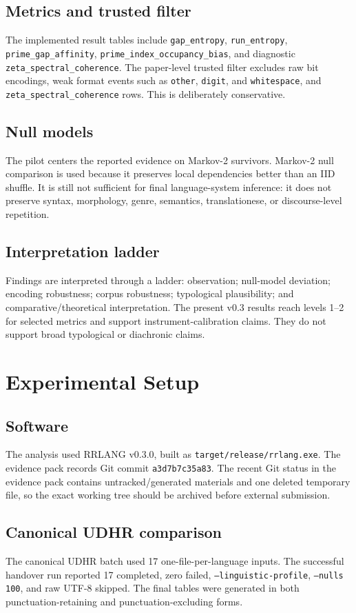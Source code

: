 \documentclass[11pt,a4paper]{article}
\newcommand{\RRLANG}{\textsc{RRLANG}}
\begin{document}
\subsection{Metrics and trusted filter}
The implemented result tables include \texttt{gap\_entropy}, \texttt{run\_entropy}, \texttt{prime\_gap\_affinity}, \texttt{prime\_index\_occupancy\_bias}, and diagnostic \texttt{zeta\_spectral\_coherence}. The paper-level trusted filter excludes raw bit encodings, weak format events such as \texttt{other}, \texttt{digit}, and \texttt{whitespace}, and \texttt{zeta\_spectral\_coherence} rows. This is deliberately conservative.

\subsection{Null models}
The pilot centers the reported evidence on Markov-2 survivors. Markov-2 null comparison is used because it preserves local dependencies better than an IID shuffle. It is still not sufficient for final language-system inference: it does not preserve syntax, morphology, genre, semantics, translationese, or discourse-level repetition.

\subsection{Interpretation ladder}
Findings are interpreted through a ladder: observation; null-model deviation; encoding robustness; corpus robustness; typological plausibility; and comparative/theoretical interpretation. The present v0.3 results reach levels 1--2 for selected metrics and support instrument-calibration claims. They do not support broad typological or diachronic claims.


\section{Experimental Setup}
\subsection{Software}
The analysis used \RRLANG{} v0.3.0, built as \texttt{target/release/rrlang.exe}. The evidence pack records Git commit \texttt{a3d7b7c35a83}. The recent Git status in the evidence pack contains untracked/generated materials and one deleted temporary file, so the exact working tree should be archived before external submission.

\subsection{Canonical UDHR comparison}
The canonical UDHR batch used 17 one-file-per-language inputs. The successful handover run reported 17 completed, zero failed, \texttt{--linguistic-profile}, \texttt{--nulls 100}, and raw UTF-8 skipped. The final tables were generated in both punctuation-retaining and punctuation-excluding forms.
\end{document}
